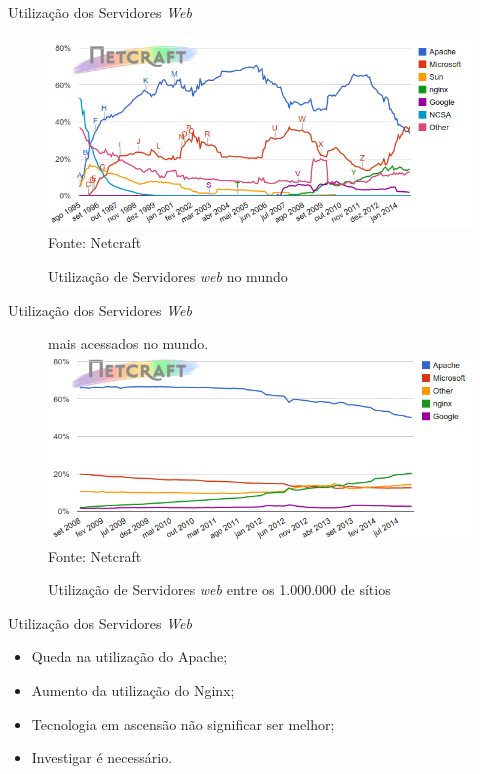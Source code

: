 \documentclass[aspectratio=43]{beamer}
\begin{document}
\begin{frame}{Utilização dos Servidores \textit{Web}}
	\begin{figure}
		\centering
		\caption{Utilização de Servidores \textit{web} no mundo}
		\includegraphics[width=1\linewidth]{../figuras/grafico1}\\
		Fonte: Netcraft
	\end{figure}
\end{frame}
\begin{frame}{Utilização dos Servidores \textit{Web}}
\begin{figure}
	\centering
	\caption{Utilização de Servidores \textit{web} entre os 1.000.000 de sítios 
	}
	mais acessados no mundo.
	\includegraphics[width=1\linewidth]{../figuras/grafico2} \\
	Fonte: Netcraft
\end{figure}
\end{frame}
\begin{frame}{Utilização dos Servidores \textit{Web}}
	\begin{itemize}
		\item Queda na utilização do Apache; \pause
		\item Aumento da utilização do Nginx; \pause
		\item Tecnologia em ascensão não significar ser melhor; \pause
		\item Investigar é necessário.
	\end{itemize}
\end{frame}
\end{document}
